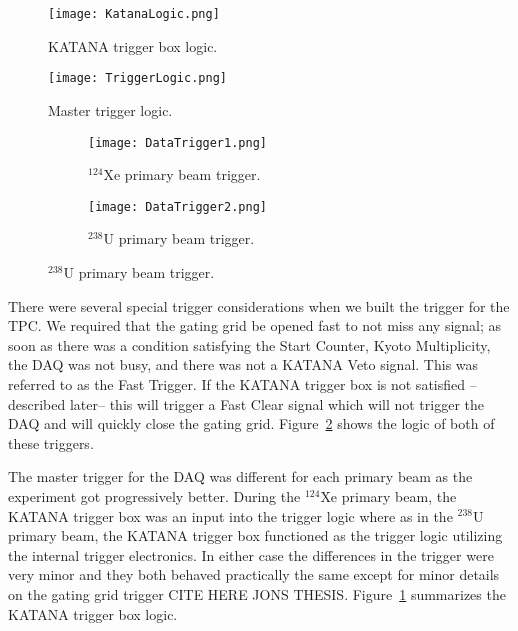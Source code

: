 \begin{figure}[!htb]
\texttt{[image: KatanaLogic.png]}
\caption{KATANA trigger box logic.}
\label{fig:katanaLogic}
\end{figure}

\begin{figure}[!htb]
\texttt{[image: TriggerLogic.png]} 
\caption{Master trigger logic.}
\label{fig:trigLogic} 
\end{figure}



\begin{figure}[!htb]
    \centering
    \begin{subfigure}[t]{0.45\textwidth}
        \centering
        \texttt{[image: DataTrigger1.png]} 
        \caption{${}^{124}$Xe primary beam trigger.} \label{fig:dataTrigger1}
    \end{subfigure}
    \hfill
    \begin{subfigure}[t]{0.45\textwidth}
        \centering
        \texttt{[image: DataTrigger2.png]} 
        \caption{${}^{238}$U primary beam trigger.} \label{fig:dataTrigger2}
    \end{subfigure}
\label{fig:datatrigger}
\end{figure}


There were several special trigger considerations when we built the trigger for the TPC. We required that the gating grid be opened fast to not miss any signal; as soon as there was a condition satisfying the Start Counter, Kyoto Multiplicity, the DAQ was not busy, and there was not a KATANA Veto signal. This was referred to as the Fast Trigger. If the KATANA trigger box is not satisfied --described later-- this will trigger a Fast Clear signal which will not trigger the DAQ and will quickly close the gating grid. Figure~\ref{fig:trigLogic} shows the logic of both of these triggers. 

The master trigger for the DAQ was different for each primary beam as the experiment got progressively better. During the ${}^{124}$Xe primary beam, the KATANA trigger box was an input into the trigger logic where as in the ${}^{238}$U primary beam, the KATANA trigger box functioned as the trigger logic utilizing the internal trigger electronics. In either case the differences in the trigger were very minor and they both behaved practically the same except for minor details on the gating grid trigger CITE HERE JONS THESIS. Figure~\ref{fig:katanaLogic} summarizes the KATANA trigger box logic. 

